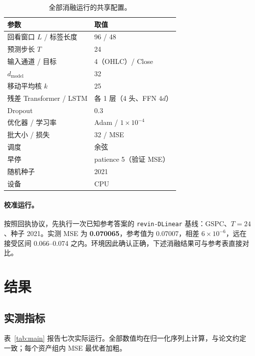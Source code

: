 \documentclass[11pt, a4paper]{ctexart}
\begin{document}
\begin{table}[H]
\centering
\caption{全部消融运行的共享配置。}
\label{tab:config}
\begin{tabular}{ll}
\toprule
参数 & 取值 \\
\midrule
回看窗口 $L$ / 标签长度 & 96 / 48 \\
预测步长 $T$ & 24 \\
输入通道 / 目标 & 4（OHLC）/ Close \\
$d_{\mathrm{model}}$ & 32 \\
移动平均核 $k$ & 25 \\
残差 Transformer / LSTM & 各 1 层（4 头、FFN $4d$） \\
Dropout & 0.3 \\
优化器 / 学习率 & Adam / $1{\times}10^{-4}$ \\
批大小 / 损失 & 32 / MSE \\
调度 & 余弦 \\
早停 & patience 5（验证 MSE） \\
随机种子 & 2021 \\
设备 & CPU \\
\bottomrule
\end{tabular}
\end{table}

\paragraph{校准运行。} 按照回执协议，先执行一次已知参考答案的
\texttt{revin-DLinear} 基线：GSPC、$T{=}24$、种子 2021。实测 MSE 为
\textbf{0.070065}，参考值为 0.07007，相差 $6\times10^{-6}$，远在接受区间
0.066--0.074 之内。环境因此确认正确，下述消融结果可与参考表直接对比。

\section{结果}

\subsection{实测指标}

表~\ref{tab:main} 报告七次实际运行。全部数值均在归一化序列上计算，与论文约定
一致；每个资产组内 MSE 最优者加粗。
\end{document}
